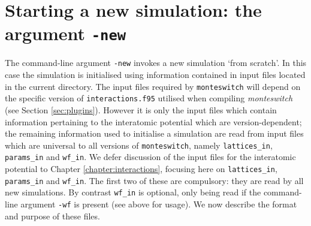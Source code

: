 \documentclass{report}
\begin{document}
\section{Starting a new simulation: the argument \texttt{-new}}
The command-line argument \texttt{-new} invokes a new simulation `from scratch'. In this case
the simulation is initialised using information contained in input files located in the current directory. The input files required
by \texttt{monteswitch} will depend on the specific version of \texttt{interactions.f95} utilised when compiling \emph{monteswitch} 
(see Section \ref{sec:plugins}). 
However it is only the input files which contain information pertaining to the interatomic potential which are version-dependent;
the remaining information used to initialise a simulation are read from input files which are universal to all versions of 
\texttt{monteswitch}, namely \texttt{lattices\_in}, \texttt{params\_in} and \texttt{wf\_in}. We defer discussion of the
input files for the interatomic potential to Chapter \ref{chapter:interactions}, focusing here on \texttt{lattices\_in}, 
\texttt{params\_in} and \texttt{wf\_in}. The first two of these are compulsory: they are read by all new simulations. 
By contrast \texttt{wf\_in} is optional, only being read if the command-line argument \texttt{-wf} is present (see above for usage). 
We now describe the format and purpose of these files.
\end{document}
